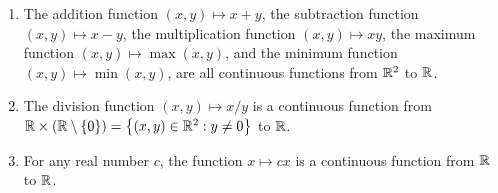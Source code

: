 \begin{lem}\label{ii:2.2.2}
  \begin{enumerate}
    \item\label{ii:2.2.2.a} The addition function \((x, y) \mapsto x + y\), the subtraction function \((x, y) \mapsto x - y\), the multiplication function \((x, y) \mapsto xy\), the maximum function \((x, y) \mapsto \max(x, y)\), and the minimum function \((x, y) \mapsto \min(x, y)\), are all continuous functions from \(\mathbb{R}^2\) to \(\mathbb{R}\).
    \item\label{ii:2.2.2.b} The division function \((x, y) \mapsto x / y\) is a continuous function from \(\mathbb{R} \times (\mathbb{R} \setminus \left\lbrace0\right\rbrace) = \left\lbrace(x, y) \in \mathbb{R}^2 : y \neq 0\right\rbrace\) to \(\mathbb{R}\).
    \item\label{ii:2.2.2.c} For any real number \(c\), the function \(x \mapsto cx\) is a continuous function from \(\mathbb{R}\) to \(\mathbb{R}\).
  \end{enumerate}
\end{lem}

